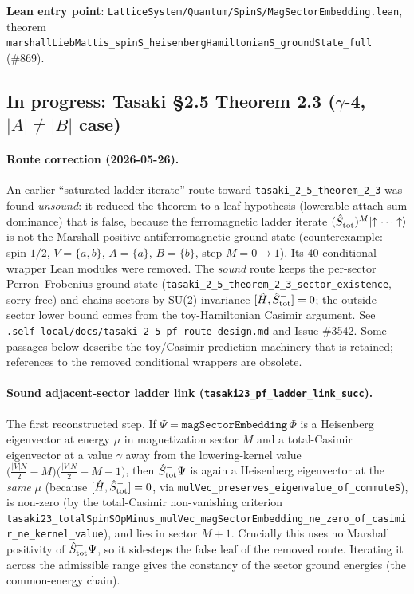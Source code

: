 \documentclass[a4paper,11pt]{article}
\begin{document}
\textbf{Lean entry point}:
\texttt{LatticeSystem/Quantum/SpinS/MagSectorEmbedding.lean},
theorem
\texttt{marshallLiebMattis\_spinS\_heisenbergHamiltonianS\_groundState\_full}
(\#869).

\subsection*{In progress: Tasaki §2.5 Theorem 2.3 ($\gamma$-4, $|A| \neq |B|$ case)}
\label{subsec:mlm-theorem-2-3}

\paragraph{Route correction (2026-05-26).} An earlier
``saturated-ladder-iterate'' route toward
\texttt{tasaki\_2\_5\_theorem\_2\_3} was found \emph{unsound}: it reduced
the theorem to a leaf hypothesis (lowerable attach-sum dominance) that is
false, because the ferromagnetic ladder iterate
$(\hat S^-_{\rm tot})^M\lvert\uparrow\cdots\uparrow\rangle$ is not the
Marshall-positive antiferromagnetic ground state (counterexample:
spin-$1/2$, $V=\{a,b\}$, $A=\{a\}$, $B=\{b\}$, step $M=0\to1$). Its $40$
conditional-wrapper Lean modules were removed. The \emph{sound} route keeps
the per-sector Perron--Frobenius ground state
(\texttt{tasaki\_2\_5\_theorem\_2\_3\_sector\_existence}, sorry-free) and
chains sectors by SU(2) invariance $[\hat H,\hat S^-_{\rm tot}]=0$; the
outside-sector lower bound comes from the toy-Hamiltonian Casimir argument.
See \texttt{.self-local/docs/tasaki-2-5-pf-route-design.md} and Issue \#3542.
Some passages below describe the toy/Casimir prediction machinery that is
retained; references to the removed conditional wrappers are obsolete.

\paragraph{Sound adjacent-sector ladder link
(\texttt{tasaki23\_pf\_ladder\_link\_succ}).} The first reconstructed
step. If $\Psi=\mathtt{magSectorEmbedding}\,\Phi$ is a Heisenberg
eigenvector at energy $\mu$ in magnetization sector $M$ and a
total-Casimir eigenvector at a value $\gamma$ away from the
lowering-kernel value
$\bigl(\tfrac{|V|N}{2}-M\bigr)\bigl(\tfrac{|V|N}{2}-M-1\bigr)$, then
$\hat S^-_{\rm tot}\Psi$ is again a Heisenberg eigenvector at the
\emph{same} $\mu$ (because $[\hat H,\hat S^-_{\rm tot}]=0$, via
\texttt{mulVec\_preserves\_eigenvalue\_of\_commuteS}), is non-zero (by
the total-Casimir non-vanishing criterion
\texttt{tasaki23\_totalSpinSOpMinus\_mulVec\_magSectorEmbedding\_ne\_zero\_of\_casimir\_ne\_kernel\_value}),
and lies in sector $M+1$. Crucially this uses no Marshall positivity of
$\hat S^-_{\rm tot}\Psi$, so it sidesteps the false leaf of the removed
route. Iterating it across the admissible range gives the constancy of
the sector ground energies (the common-energy chain).
\end{document}
